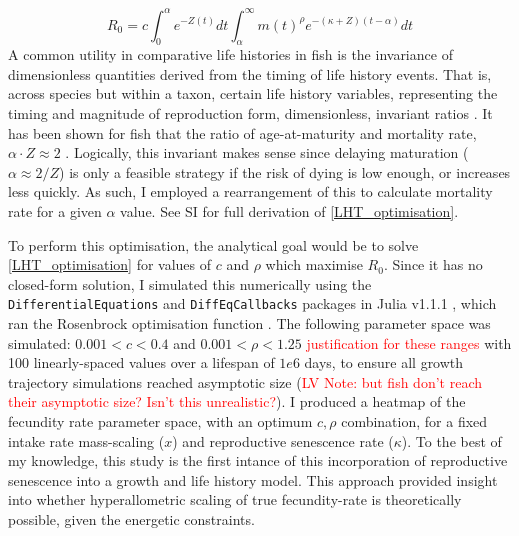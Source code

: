 \documentclass[a4paper]{article} %
\begin{document}
\begin{equation}
    R_{0} = c\int_{0}^{\alpha}e^{-Z(t)}dt\int_{\alpha}^{\infty} m(t)^{\rho} e^{-(\kappa+Z)(t-\alpha)} dt \label{LHT_optimisation}
\end{equation}
A common utility in comparative life histories in fish is the invariance of dimensionless quantities derived from the timing of life history events. That is, across species but within a taxon, certain life history variables, representing the timing and magnitude of reproduction form, dimensionless, invariant ratios \autocite{Charnov1990-invariant, Charnov1993}. It has been shown for fish that the ratio of age-at-maturity and mortality rate, $\alpha\cdot Z \approx 2$ \autocite{Charnov1993}. Logically, this invariant makes sense since delaying maturation ($\alpha \approx 2/Z$) is only a feasible strategy if the risk of dying is low enough, or increases less quickly. As such, I employed a rearrangement of this to calculate mortality rate for a given $\alpha$ value.
See SI for full derivation of \cref{LHT_optimisation}.

To perform this optimisation, the analytical goal would be to solve \cref{LHT_optimisation} for values of $c$ and $\rho$ which maximise $R_0$. Since it has no closed-form solution, I simulated this numerically using the \texttt{DifferentialEquations} and \texttt{DiffEqCallbacks} packages in Julia v1.1.1 \autocite{Bezanson2017}, which ran the Rosenbrock optimisation function \autocite{Rosenbrock1960}. The following parameter space was simulated: $0.001 < c < 0.4$ and $0.001 < \rho < 1.25$ \textcolor{red}{justification for these ranges} with 100 linearly-spaced values over a lifespan of $1e6$ days, to ensure all growth trajectory simulations reached asymptotic size (\textcolor{red}{LV Note: but fish don't reach their asymptotic size? Isn't this unrealistic?}). I produced a heatmap of the fecundity rate parameter space, with an optimum $c, \rho$ combination, for a fixed intake rate mass-scaling ($x$) and reproductive senescence rate ($\kappa$). To the best of my knowledge, this study is the first intance of this incorporation of reproductive senescence into a growth and life history model. This approach provided insight into whether hyperallometric scaling of true fecundity-rate is theoretically possible, given the energetic constraints.
\end{document}
